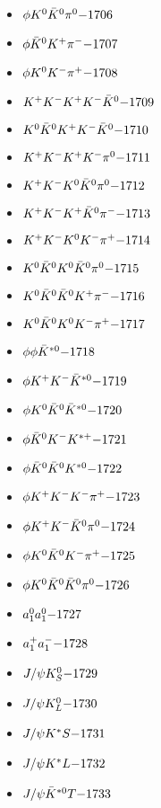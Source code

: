 \begin{multicols}{3}
\begin{itemize}
 \item $ \phi K^{0} \bar{K}^{0} \pi^{0} \hfill{-1706}$
 \item $ \phi \bar{K}^{0} K^{+} \pi^{-} \hfill{-1707}$
 \item $ \phi K^{0} K^{-} \pi^{+} \hfill{-1708}$
 \item $ K^{+} K^{-} K^{+} K^{-} \bar{K}^{0} \hfill{-1709}$
 \item $ K^{0} \bar{K}^{0} K^{+} K^{-} \bar{K}^{0} \hfill{-1710}$
 \item $ K^{+} K^{-} K^{+} K^{-} \pi^{0} \hfill{-1711}$
 \item $ K^{+} K^{-} K^{0} \bar{K}^{0} \pi^{0} \hfill{-1712}$
 \item $ K^{+} K^{-} K^{+} \bar{K}^{0} \pi^{-} \hfill{-1713}$
 \item $ K^{+} K^{-} K^{0} K^{-} \pi^{+} \hfill{-1714}$
 \item $ K^{0} \bar{K}^{0} K^{0} \bar{K}^{0} \pi^{0} \hfill{-1715}$
 \item $ K^{0} \bar{K}^{0} \bar{K}^{0} K^{+} \pi^{-} \hfill{-1716}$
 \item $ K^{0} \bar{K}^{0} K^{0} K^{-} \pi^{+} \hfill{-1717}$
 \item $ \phi \phi \bar{K}^{*0} \hfill{-1718}$
 \item $ \phi K^{+} K^{-} \bar{K}^{*0} \hfill{-1719}$
 \item $ \phi K^{0} \bar{K}^{0} \bar{K}^{*0} \hfill{-1720}$
 \item $ \phi \bar{K}^{0} K^{-} K^{*+} \hfill{-1721}$
 \item $ \phi \bar{K}^{0} \bar{K}^{0} K^{*0} \hfill{-1722}$
 \item $ \phi K^{+} K^{-} K^{-} \pi^{+} \hfill{-1723}$
 \item $ \phi K^{+} K^{-} \bar{K}^{0} \pi^{0} \hfill{-1724}$
 \item $ \phi K^{0} \bar{K}^{0} K^{-} \pi^{+} \hfill{-1725}$
 \item $ \phi K^{0} \bar{K}^{0} \bar{K}^{0} \pi^{0} \hfill{-1726}$
 \item $ a_{1}^{0} a_{1}^{0} \hfill{-1727}$
 \item $ a_{1}^{+} a_{1}^{-} \hfill{-1728}$
 \item $ J/\psi K_{S}^{0} \hfill{-1729}$
 \item $ J/\psi K_{L}^{0} \hfill{-1730}$
 \item $ J/\psi K^{*}S \hfill{-1731}$
 \item $ J/\psi K^{*}L \hfill{-1732}$
 \item $ J/\psi \bar{K}^{*0}T \hfill{-1733}$

\end{itemize}
\end{multicols}
